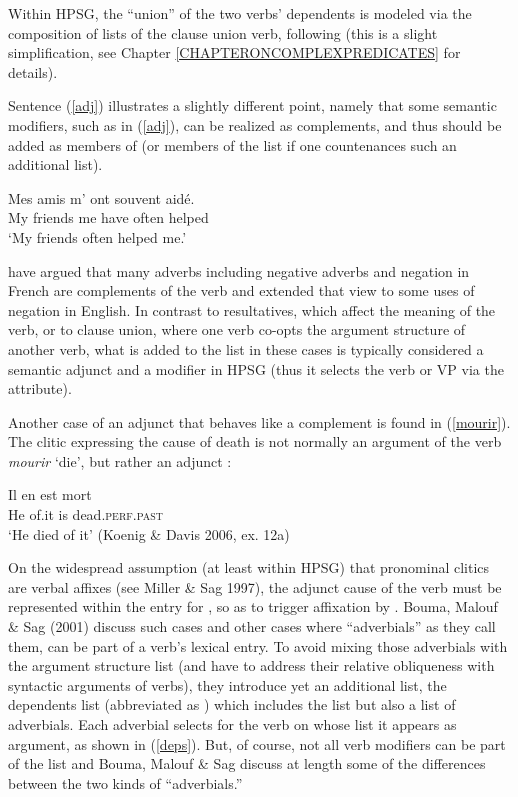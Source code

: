 \documentclass[output=paper]{langsci/langscibook}
\begin{document}
\noindent
Within HPSG, the ``union'' of the two verbs' dependents is modeled via the composition of \argst lists of the clause union verb, following \citet{HinrichsandNakazawa1994} (this is a slight simplification, see Chapter \ref{CHAPTERONCOMPLEXPREDICATES} for details). 

Sentence (\ref{adj}) illustrates a slightly different point, namely that some semantic modifiers, such as  in (\ref{adj}), can be realized as complements, and thus should be added as members of \argst (or members of the \deps list if one countenances such an additional list). 

\begin{exe}
\ex\label{adj}
 \gll
	Mes amis m’ ont souvent aidé. \\
	My friends me have often helped \\
	\glt `My friends often helped me.'
\end{exe}

\noindent
\citet{AbeilleandGodard1997} have argued that many adverbs including negative adverbs and negation in French are complements of the verb and \citet{KimandSag2002} extended that view to some uses of negation in English. In contrast to resultatives, which affect the meaning of the verb, or to clause union, where one verb co-opts the argument structure of another verb, what is added to the \argst list in these cases is typically considered a semantic adjunct and a modifier in HPSG (thus it selects the verb or VP via the  attribute). 

Another case of an adjunct that behaves like a complement is found in (\ref{mourir}).  The clitic  expressing the cause of death   is not normally an argument of the verb \textit{mourir} `die', but rather an adjunct \citep{KoenigandDavis2006}: %

\begin{exe}
	\ex\label{mourir}
	\gll Il en est mort \\
	 He of.it is dead.\textsc{perf.past} \\
	 \glt `He died of it' (Koenig \& Davis 2006, ex. 12a)
\end{exe}

\noindent
On the widespread assumption (at least within HPSG) that pronominal clitics are verbal affixes (see Miller \& Sag 1997), the adjunct cause of the verb  must be represented within the entry for , so as to trigger affixation by .  Bouma, Malouf \& Sag (2001) discuss such cases and other cases where ``adverbials'' as they call them, can be part of a verb's lexical entry. To avoid mixing those adverbials with the argument structure list (and have to address their relative obliqueness with syntactic arguments of verbs), they introduce yet an additional list, the dependents list (abbreviated as \deps) which includes the \argst list but also a list of adverbials. Each adverbial selects for the verb on whose \deps list it appears as argument, as shown in (\ref{deps}). But, of course, not all verb modifiers can be part of the \deps list and Bouma, Malouf \& Sag discuss at length some of the differences between the two kinds of ``adverbials.''
\end{document}
